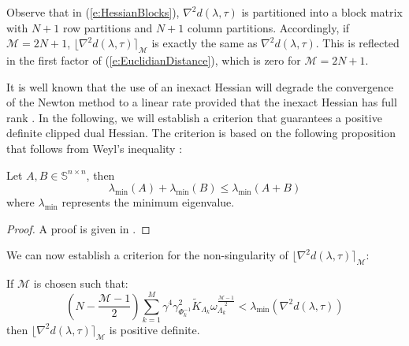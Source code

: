 Observe that in (\ref{e:HessianBlocks}), $\nabla^2 d(\lambda,\tau)$ is partitioned into a block matrix with $N+1$ row partitions and $N+1$ column partitions. Accordingly, if $\mathcal{M} = 2N+1$, $\lfloor \nabla^2 d(\lambda, \tau) \rceil_{\mathcal{M}}$ is exactly the same as $\nabla^2 d(\lambda,\tau)$. This is reflected in the first factor of (\ref{e:EuclidianDistance}), which is zero for $\mathcal{M} = 2N+1$.

It is well known that the use of an inexact Hessian will degrade the convergence of the Newton method to a linear rate provided that the inexact Hessian has full rank \cite{Nocedal2006}. In the following, we will establish a criterion that guarantees a positive definite clipped dual Hessian. The criterion is based on the following proposition that follows from Weyl's inequality \cite{HornR2013}:
\begin{proposition} \label{p:Weyl}
Let $A, B \in \mathbb{S}^{n \times n}$, then
\begin{equation} \label{e:minEigenvalueLemma}
\lambda_{\min} (A) + \lambda_{\min} (B) \leq \lambda_{\min} (A + B)
\end{equation} 
where $\lambda_{\min}$ represents the minimum eigenvalue.
\end{proposition}
\begin{proof}
A proof is given in \cite{HornR2013}.
\end{proof}
We can now establish a criterion for the non-singularity of $\lfloor \nabla^2 d(\lambda, \tau) \rceil_{\mathcal{M}}$:
\begin{lemma} \label{l:nonsingularClippedHessian}
If $\mathcal{M}$ is chosen such that:
\begin{equation} \label{e:nonsingularClippedHessian}
\left( N -\frac{\mathcal{M} - 1}{2} \right) \sum_{k=1}^M \gamma^4 \gamma_{\Phi_k^{-1}}^2 \tilde{K}_{\Lambda_k} \omega_{\Lambda_k}^{\frac{\mathcal{M} - 1}{2}} < \lambda_{\min}( \nabla^2 d(\lambda, \tau) )
\end{equation}
then $\lfloor \nabla^2 d(\lambda, \tau) \rceil_{\mathcal{M}}$ is positive definite.
\end{lemma}
